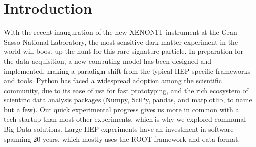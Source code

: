 \documentclass[a4paper]{jpconf}
\begin{document}
\begin{abstract}
\end{abstract}

\section{Introduction}

With the recent inauguration of the new XENON1T instrument at the Gran Sasso National Laboratory,
the most sensitive dark matter experiment in the world will boost-up the hunt for this rare-signature particle.
In preparation for the data acquisition, a new computing model has been designed and implemented, making a paradigm
shift from the typical HEP-specific frameworks and tools. 
Python has faced a widespread adoption among the scientific community, due to its ease of use for fast prototyping, and
the rich ecosystem of scientific data analysis packages (Numpy, SciPy, pandas, and matplotlib, to name but a few).
Our quick experimental progress gives us more in common 
with a tech startup than most other experiments, which is why we explored communal Big Data solutions.
Large HEP experiments have an investment in software spanning 20 years, which mostly uses the ROOT framework and data format. 
\end{document}

